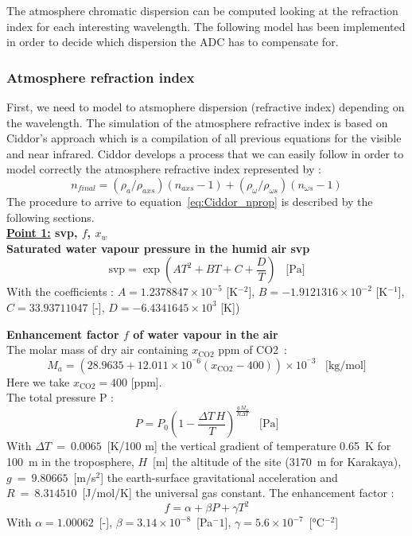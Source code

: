 The atmosphere chromatic dispersion can be computed looking at the refraction index for each interesting wavelength. The following model has been implemented in order to decide which dispersion the ADC has to compensate for.

\subsubsection{Atmosphere refraction index}
First, we need to model to atsmophere dispersion (refractive index) depending on the wavelength. The simulation of the atmosphere refractive index is based on Ciddor's approach \cite{Ciddor} which is a compilation of all previous equations for the visible and near infrared. Ciddor develops a process that we can easily follow in order to model correctly the atmosphere refractive index represented by :
\begin{equation}
	n_{final} = \left(\rho_a / \rho_{axs}\right)\left(n_{axs}-1\right)+\left(\rho_\omega / \rho_{\omega s}\right)\left(n_{\omega s}-1\right)\label{eq:Ciddor_nprop}
\end{equation}
The procedure to arrive to equation~\eqref{eq:Ciddor_nprop} is described by the following sections.\\

\textbf{\underline{Point 1:} svp, $f$, $x_w$}\\
\textbf{Saturated water vapour pressure in the humid air svp}\\
\begin{equation}
	\text{svp} = \exp\left(AT^2+BT +C+\frac{D}{T}\right)\,\,\,\,\,\text{[Pa]}\label{eq:svp}
\end{equation}
With the coefficients : $A = 1.2378847\times 10^{-5}$ [K$^{-2}$], $B = -1.9121316\times 10^{-2}$ [K$^{-1}$], $C = 33.93711047$ [-], $D = -6.4341645\times 10^3$ [K])

\textbf{Enhancement factor $f$ of water vapour in the air}\\
The molar mass of dry air containing $x_\text{CO2}$ ppm of CO2~:
\begin{equation}
	M_a = \left(28.9635+12.011\times 10^{^-6}(x_\text{CO2}-400)\right)\times 10^{^-3}\,\,\,\,\,\text{[kg/mol]}\label{eq:Ma}
\end{equation}
Here we take $x_\text{CO2} = 400$ [ppm].\\
The total pressure P :
\begin{equation}
	P = P_0\left(1-\frac{\Delta T\,H}{T}\right)^{\frac{g\,M_a}{R\Delta T}}\,\,\,\,\,\text{[Pa]}\label{eq:P}
\end{equation}
With $\Delta T~=~0.0065$~[K/100 m] the vertical gradient of temperature 0.65~K for 100~m in the troposphere\cite{app:wiki_troposphere}, $H$~[m] the altitude of the site (3170~m for Karakaya), $g~=~9.80665$~[m/s$^2$] the  earth-surface gravitational acceleration and $R~=~8.314510$~[J/mol/K] the universal gas constant.
The enhancement factor :
\begin{equation}
	f = \alpha+\beta P+\gamma T^2 
\end{equation}
With $\alpha = 1.00062$~[-], $\beta  = 3.14\times 10^{-8}$~[Pa$^-1$], $\gamma = 5.6\times 10^{-7}$~[°C$^{-2}$]

